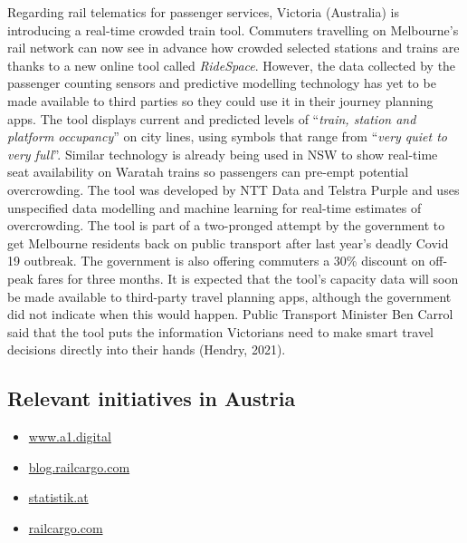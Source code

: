 \documentclass[
]{book}
\providecommand{\tightlist}{%
  \setlength{\itemsep}{0pt}\setlength{\parskip}{0pt}}
\begin{document}
Regarding rail telematics for passenger services, Victoria (Australia) is introducing a real-time crowded train tool. Commuters travelling on Melbourne's rail network can now see in advance how crowded selected stations and trains are thanks to a new online tool called \emph{RideSpace}. However, the data collected by the passenger counting sensors and predictive modelling technology has yet to be made available to third parties so they could use it in their journey planning apps. The tool displays current and predicted levels of ``\emph{train, station and platform occupancy}'' on city lines, using symbols that range from ``\emph{very quiet to very full}''. Similar technology is already being used in NSW to show real-time seat availability on Waratah trains so passengers can pre-empt potential overcrowding. The tool was developed by NTT Data and Telstra Purple and uses unspecified data modelling and machine learning for real-time estimates of overcrowding. The tool is part of a two-pronged attempt by the government to get Melbourne residents back on public transport after last year's deadly Covid 19 outbreak. The government is also offering commuters a 30\% discount on off-peak fares for three months. It is expected that the tool's capacity data will soon be made available to third-party travel planning apps, although the government did not indicate when this would happen. Public Transport Minister Ben Carrol said that the tool puts the information Victorians need to make smart travel decisions directly into their hands (Hendry, 2021).

\hypertarget{relevant-initiatives-in-austria-21}{%
\subsection*{Relevant initiatives in Austria}\label{relevant-initiatives-in-austria-21}}

\begin{itemize}
\tightlist
\item
  \href{https://www.a1.digital/en-de/about-a1-digital/Press-Releases/OBB-freight-trains-become-smart-with-A1-Digital/}{www.a1.digital}
\item
  \href{https://blog.railcargo.com/en/artikel/smart-cargo-erstmontage}{blog.railcargo.com}
\item
  \href{https://www.statistik.at/web_de/statistiken/energie_umwelt_innovation_mobilitaet/verkehr/schiene/gueterverkehr/index.html}{statistik.at}
\item
  \href{https://www.railcargo.com/de/unternehmen/international/oesterreich}{railcargo.com}
\end{itemize}
\end{document}
